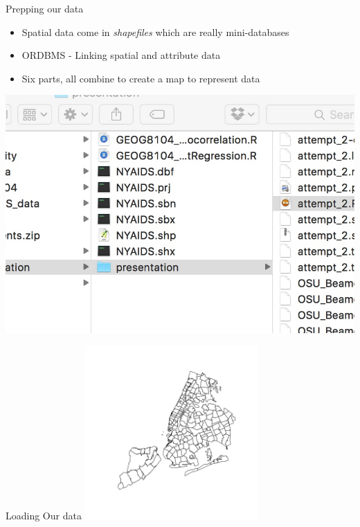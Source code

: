 \documentclass[aspectratio = 169, 12pt]{beamer}\usepackage[]{graphicx}\usepackage[]{color}
\newenvironment{knitrout}{}{} %
\begin{document}
\begin{frame}{Prepping our data}
\begin{itemize}
\item Spatial data come in \textit{shapefiles} which are really mini-databases
\item ORDBMS - Linking spatial and attribute data
\item Six parts, all combine to create a map to represent data
\end{itemize}
\includegraphics[scale=0.2]{files_screenshot}
\end{frame}

\begin{frame}[fragile]{Loading Our data}
\begin{knitrout}\tiny
{}\color{fgcolor}
\includegraphics[width=250px]{figure/unnamed-chunk-1-1} 

\end{knitrout}
\end{frame}
\end{document}

